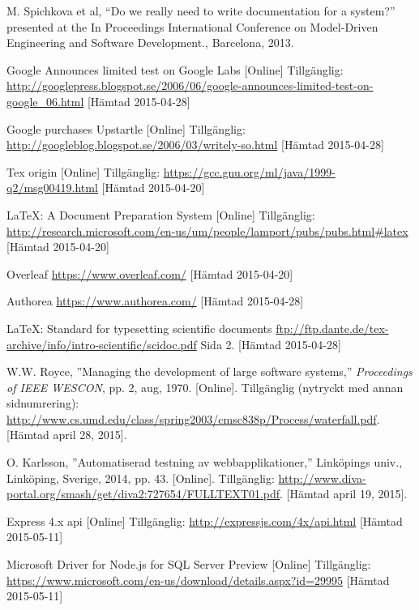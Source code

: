 \begin{thebibliography}{9}
M. Spichkova et al, “Do we really need to write documentation for a system?” presented at the In Proceedings International Conference on Model-Driven Engineering and Software Development., Barcelona, 2013.

Google Announces limited test on Google Labs [Online] Tillgänglig: 
\url{http://googlepress.blogspot.se/2006/06/google-announces-limited-test-on-google_06.html} [Hämtad 2015-04-28]

Google purchases Upstartle [Online] Tillgänglig: 
\url{http://googleblog.blogspot.se/2006/03/writely-so.html} [Hämtad 2015-04-28]

Tex origin [Online] Tillgänglig: 
\url{https://gcc.gnu.org/ml/java/1999-q2/msg00419.html} [Hämtad 2015-04-20]

LaTeX: A Document Preparation System [Online] Tillgänglig: 
\url{http://research.microsoft.com/en-us/um/people/lamport/pubs/pubs.html#latex} [Hämtad 2015-04-20]

Overleaf 
\url{https://www.overleaf.com/} [Hämtad 2015-04-20]

Authorea 
\url{https://www.authorea.com/} [Hämtad 2015-04-28]
 
LaTeX: Standard for typesetting scientific documents
\url{ftp://ftp.dante.de/tex-archive/info/intro-scientific/scidoc.pdf} Sida 2. [Hämtad 2015-04-28]

W.W. Royce, ''Managing the development of large software systems,''
\textit{Proceedings of IEEE WESCON}, pp. 2, aug, 1970.
[Online].
Tillgänglig (nytryckt med annan sidnumrering):
\url{http://www.cs.umd.edu/class/spring2003/cmsc838p/Process/waterfall.pdf}.
[Hämtad april 28, 2015].

O. Karlsson, ''Automatiserad testning av webbapplikationer,''
Linköpings univ., Linköping, Sverige, 2014, pp. 43.
[Online]. 
Tillgänglig: 
\url{http://www.diva-portal.org/smash/get/diva2:727654/FULLTEXT01.pdf}.
[Hämtad april 19, 2015].

Express 4.x api [Online] Tillgänglig: 
\url{http://expressjs.com/4x/api.html} [Hämtad 2015-05-11]

Microsoft Driver for Node.js for SQL Server Preview [Online] Tillgänglig: 
\url{https://www.microsoft.com/en-us/download/details.aspx?id=29995} [Hämtad 2015-05-11]


\end{thebibliography}
